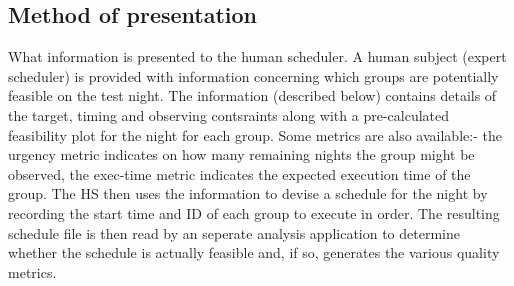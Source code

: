 \subsection{Method of presentation}
What information is presented to the human scheduler.
A human subject (expert scheduler) is provided with information concerning which groups are potentially feasible on the test night. The information (described below) contains details of the target, timing and observing contsraints along with a pre-calculated feasibility plot for the night for each group. Some metrics are also available:- the urgency metric indicates on how many remaining nights the group might be observed, the exec-time metric indicates the expected execution time of the group. The HS then uses the information to devise a schedule for the night by recording the start time and ID of each group to execute in order.
The resulting schedule file is then read by an seperate analysis application to determine whether the schedule is actually feasible and, if so, generates the various quality metrics.

